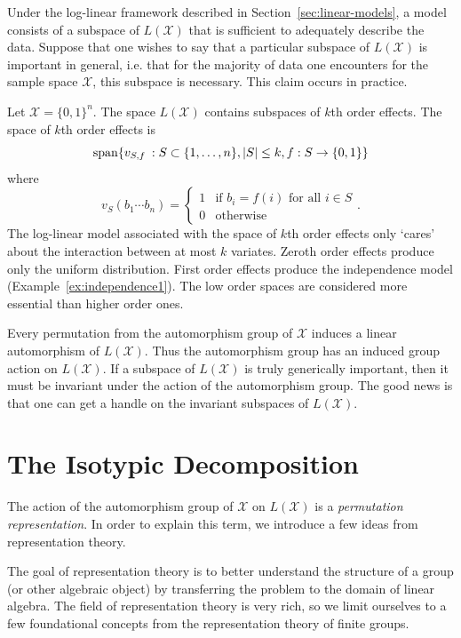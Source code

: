 \documentclass[cclicense]{hmcthesis}
\providecommand*{\xs}{\mathcal X}
\newcommand*{\STB}{\::}
\numberwithin{equation}{chapter}
\numberwithin{thmcounter}{chapter}
\begin{document}
    Under the log-linear framework described in Section~\ref{sec:linear-models},
    a model consists of a subspace of $L(\xs)$ that is sufficient to adequately
    describe the data.  Suppose that one wishes to say that a particular
    subspace of $L(\xs)$ is important in general, i.e. that for the majority of
    data one encounters for the sample space $\xs$, this subspace is necessary.
    This claim occurs in practice.

    \begin{example}
        Let $\xs = \{0, 1\}^n$.  The space $L(\xs)$ contains subspaces of $k$th
        order effects.  The space of $k$th order effects is
        \[
            \mathrm{span}\cdel*{v_{S,f} \STB S \subset \{1, \ldots, n\}, |S| \le
            k, f : S \to \{0, 1\}}
        \]
        where 
        \[
            v_S (b_1 \cdots b_n) = \begin{cases}
                1 & \text{if $b_i = f(i)$ for all $i \in S$} \\
                0 & \text{otherwise}
            \end{cases}.
        \]
        The log-linear model associated with the space of $k$th order effects
        only `cares' about the interaction between at most $k$ variates.  Zeroth
        order effects produce only the uniform distribution.  First order
        effects produce the independence model (Example~\ref{ex:independence1}).
        The low order spaces are considered more essential than higher order
        ones.
    \end{example}

    Every permutation from the automorphism group of $\xs$ induces a linear
    automorphism of $L(\xs)$.  Thus the automorphism group has an induced group
    action on $L(\xs)$.  If a subspace of $L(\xs)$ is truly generically
    important, then it must be invariant under the action of the automorphism
    group.  The good news is that one can get a handle on the invariant
    subspaces of $L(\xs)$.


\section{The Isotypic Decomposition}
    The action of the automorphism group of $\xs$ on $L(\xs)$ is a
    \emph{permutation representation}.  In order to explain this term, we
    introduce a few ideas from representation theory.
    
    The goal of representation theory is to better understand the structure of a
    group (or other algebraic object) by transferring the problem to the domain
    of linear algebra.  The field of representation theory is very rich, so we
    limit ourselves to a few foundational concepts from the representation
    theory of finite groups.
\end{document}
